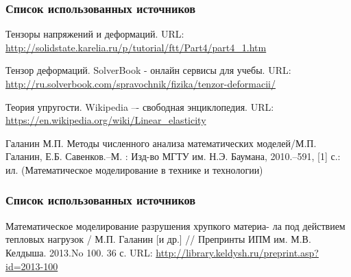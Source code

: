 \documentclass[unicode, 8pt]{beamer}
\begin{document}
    \begin{frame}
        \frametitle{Список использованных источников}
        \begin{thebibliography}{9}
             Тензоры напряжений и деформаций. URL: \url{http://solidstate.karelia.ru/p/tutorial/ftt/Part4/part4_1.htm}

             Тензор деформаций. SolverBook - онлайн сервисы для учебы. URL: \url{http://ru.solverbook.com/spravochnik/fizika/tenzor-deformacii/}

             Теория упругости. Wikipedia –- свободная энциклопедия. URL: \url{https://en.wikipedia.org/wiki/Linear_elasticity}

              Галанин М.П. Методы численного анализа математических моделей/М.П. Галанин, Е.Б. Савенков.–М. : Изд-во МГТУ им. Н.Э. Баумана, 2010.–591, [1] с.: ил. (Математическое моделирование в технике и технологии)

        \end{thebibliography}
    \end{frame}

    \begin{frame}
        \frametitle{Список использованных источников}
        \begin{thebibliography}{9}

             Математическое моделирование разрушения хрупкого материа- ла под действием тепловых нагрузок / М.П. Галанин [и др.] // Препринты ИПМ им. М.В. Келдыша. 2013.No 100. 36 с. URL: \url{http://library.keldysh.ru/preprint.asp?id=2013-100}
        \end{thebibliography}
    \end{frame}
    
\end{document}
